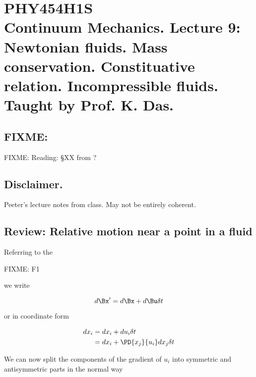 
%

\chapter{PHY454H1S\\Continuum Mechanics.  Lecture 9: Newtonian fluids.  Mass conservation.  Constituative relation.  Incompressible fluids.  Taught by Prof. K. Das.}
\label{chap:continuumL9}
{}
\date{Feb 8, 2012}

\beginArtWithToc

\section{FIXME:}

FIXME: Reading: \S XX from \cite{acheson1990elementary}?

\section{Disclaimer.}

Peeter's lecture notes from class.  May not be entirely coherent.

\section{Review: Relative motion near a point in a fluid}

Referring to the 

FIXME: F1

we write

\begin{equation}\label{eqn:continuumL9:10}
d\Bx' = d\Bx + d\Bu \delta t
\end{equation}

or in coordinate form

\begin{equation}\label{eqn:continuumL9:30}
\begin{aligned}
dx_i 
&= dx_i + du_i \delta t \\
&= dx_i + \PD{x_j}{u_i} dx_j \delta t 
\end{aligned}
\end{equation}

We can now split the components of the gradient of $u_i$ into symmetric and antisymmetric parts in the normal way

